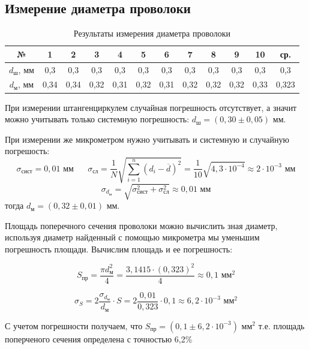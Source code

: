 \documentclass[a4paper, 12pt]{article}
\begin{document}
\subsection{Измерение диаметра проволоки}
\begin{table}[h]
	\begin{center}
		\begin{tabular}{|c|c|c|c|c|c|c|c|c|c|c|c|}
			\hline
			№ & 1 & 2 & 3 & 4 & 5 & 6 & 7 & 8 & 9 & 10 & ср. \\
			\hline
			$d_\text{ш}$, мм & 0,3 & 0,3& 0,3& 0,3& 0,3& 0,3& 0,3& 0,3& 0,3& 0,3& 0,3\\ 
			\hline
			$d_\text{м}$, мм & 0,34 & 0,34 & 0,32 & 0,31 & 0,32& 0,31& 0,32& 0,32& 0,32& 0,33& 0,323\\ 
			\hline
		\end{tabular}
	\end{center}
	\caption{Результаты измерения диаметра проволоки}
	\label{dtab}
\end{table}

При измерении штангенциркулем случайная погрешность отсутствует, а значит можно учитывать только системную погрешность: $d_\text{ш} = \left( 0,30 \pm 0,05 \right) \text{ мм}$.

При измерении же микрометром нужно учитывать и системную и случайную погрешость:
$$\sigma_\text{сист}=0,01\text{ мм}\;\;\;\;\;\; \sigma_\text{сл}=\frac{1}{N} \sqrt{\sum_{i=1}^{n}(d_i - \overline{d})^2}=\frac{1}{10} \sqrt{4,3\cdot 10^{-4}}\approx 2\cdot 10^{-3} \text{ мм}$$
$$\sigma_{d_\text{м}} = \sqrt{\sigma_\text{сист}^2+\sigma_\text{сл}^2}\approx 0,01 \text{ мм}$$
\noindent тогда $d_\text{м} = \left( 0,32 \pm 0,01 \right) \text{ мм}$.

Площадь поперечного сечения проволоки можно вычислить зная диаметр, используя диаметр найденный с помощью микрометра мы уменьшим погрешность площади. Вычислим площадь и ее погрешность:

\begin{equation}
	S_\text{пр} = \frac{\pi d_\text{м}^2}{4} = \frac{3,1415\cdot (0,323)^2}{4} \approx 0,1 \text{ мм}^2
\end{equation}

\begin{equation}
	\sigma_S = 2\frac{\sigma_{d_\text{м}}}{d_\text{м}}\cdot S = 2\frac{0,01}{0,323} \cdot 0,1 \approx 6,2\cdot 10^{-3} \text{ мм}^2
\end{equation}

С учетом погрешности получаем, что $S_\text{пр} = \left( 0,1 \pm 6,2 \cdot 10^{-3}\right) \text{ мм}^2$ т.е. площадь поперченого сечения определена с точностью 6,2\%
\end{document}
